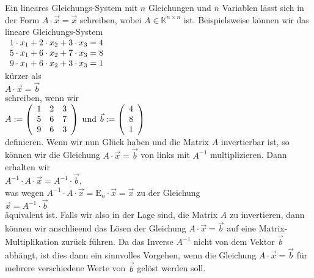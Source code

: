 \remark
Ein lineares Gleichungs-System mit $n$ Gleichungen und $n$ Variablen l\"{a}sst sich in der Form
$A \cdot \vec{x} = \vec{x}$ schreiben, wobei $A \in \mathbb{K}^{n \times n}$ ist.
  Beispielsweise k\"{o}nnen wir das lineare Gleichungs-System
\\[0.2cm]
\hspace*{1.3cm}
$
\begin{array}[c]{lllcl}
  1 \cdot x_1 + 2 \cdot x_2 + 3 \cdot x_3 = 4 \\ 
  5 \cdot x_1 + 6 \cdot x_2 + 7 \cdot x_3 = 8 \\ 
  9 \cdot x_1 + 6 \cdot x_2 + 3 \cdot x_3 = 1 \\ 
\end{array}
$
\\[0.2cm]
k\"{u}rzer als
\\[0.2cm]
\hspace*{1.3cm}
$A \cdot \vec{x} = \vec{b}$
\\[0.2cm]
schreiben, wenn wir
\\[0.2cm]
\hspace*{1.3cm}
$A := \left(
  \begin{array}[c]{lll}
    1 & 2 & 3 \\
    5 & 6 & 7 \\
    9 & 6 & 3 \\
  \end{array}
  \right)
$ \quad und \quad
$\vec{b} := \left(
  \begin{array}[c]{l}
    4 \\
    8 \\
    1 \\
  \end{array}
  \right)
$
\\[0.2cm]
definieren.  Wenn wir nun Gl\"{u}ck haben und die Matrix $A$ invertierbar ist, so k\"{o}nnen wir die
Gleichung $A \cdot \vec{x} = \vec{b}$ von links mit $A^{-1}$ multiplizieren.  Dann erhalten wir
\\[0.2cm]
\hspace*{1.3cm}
$A^{-1} \cdot A \cdot \vec{x} = A^{-1} \cdot \vec{b}$,
\\[0.2cm]
was wegen $A^{-1} \cdot A \cdot \vec{x} = \mathrm{E}_n \cdot \vec{x} = \vec{x}$ zu der Gleichung
\\[0.2cm]
\hspace*{1.3cm}
$\vec{x} = A^{-1} \cdot \vec{b}$
\\[0.2cm]
\"{a}quivalent ist.  Falls wir also in der Lage sind, die Matrix $A$ zu invertieren,  dann k\"{o}nnen wir anschlie\3end
das L\"{o}sen der Gleichung $A \cdot \vec{x} = \vec{b}$  auf eine Matrix-Multiplikation zur\"{u}ck
f\"{u}hren.  Da das Inverse $A^{-1}$ nicht von dem Vektor $\vec{b}$ abh\"{a}ngt, ist dies dann ein
sinnvolles Vorgehen, wenn die Gleichung $A \cdot \vec{x} = \vec{b}$ f\"{u}r mehrere verschiedene Werte von
$\vec{b}$ gel\"{o}st werden soll.  \eoxs

